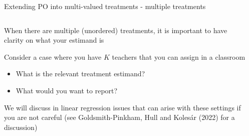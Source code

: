 \documentclass[notes,11pt, aspectratio=169]{beamer}
\newenvironment{wideitemize}{\itemize\addtolength{\itemsep}{10pt}}{\enditemize}
\begin{document}
\begin{frame}{Extending PO into multi-valued treatments - multiple treatments}
\begin{columns}[T] %
  \begin{column}{.6\textwidth}
    \begin{wideitemize}
    \item When there are multiple (unordered) treatments, it is
      important to have clarity on what your estimand is
    \item Consider a case where you have $K$ teachers that you can
      assign in a classroom
      \begin{itemize}
      \item What is the relevant treatment estimand?
      \item What would you want to report?
      \end{itemize}
      \pause 
    \item We will discuss in linear regression issues that can arise
      with these settings if you are not careful (see
      Goldsmith-Pinkham, Hull and Koles\'ar (2022) for a discussion)
\end{wideitemize}    

\end{column}%
  \hfill%
  \begin{column}{.4\textwidth}
  \end{column}
\end{columns}
\end{frame}
\end{document}
